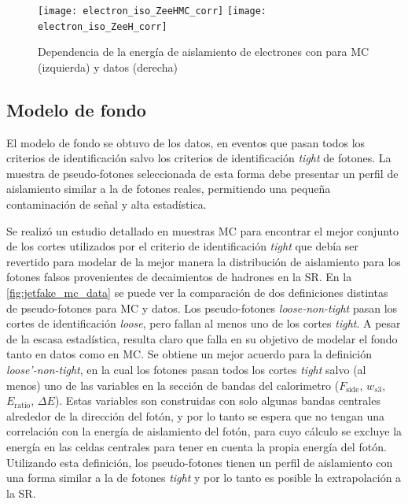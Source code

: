\begin{figure}[!h]
  \centering

  \texttt{[image: electron\_iso\_ZeeHMC\_corr]}
  \texttt{[image: electron\_iso\_ZeeH\_corr]}

  \caption{Dependencia de la energía de aislamiento de electrones con {\HT}
    para MC (izquierda) y datos (derecha) \Zee}
    \label{fig:electron_iso_HT}

\end{figure}



\subsection{Modelo de fondo} \label{sec:jfake_bkg_template}

El modelo de fondo se obtuvo de los datos, en eventos que pasan todos los
criterios de identificación salvo los criterios de identificación \emph{tight}
de fotones. La muestra de pseudo-fotones seleccionada de esta forma debe
presentar un perfil de aislamiento similar a la de fotones reales, permitiendo
una pequeña contaminación de señal y alta estadística.

Se realizó un estudio detallado en muestras MC para encontrar el mejor conjunto
de los cortes utilizados por el criterio de identificación \emph{tight} que debía ser
revertido para modelar de la mejor manera la distribución de aislamiento para
los fotones falsos provenientes de decaimientos de hadrones en la SR. En la
\cref{fig:jetfake_mc_data} se puede ver la comparación de dos definiciones
distintas de pseudo-fotones para MC y datos.
Los pseudo-fotones \emph{loose-non-tight} pasan los cortes de
identificación \emph{loose}, pero fallan al menos uno de los cortes
\emph{tight}. A pesar de la escasa estadística, resulta claro que falla en su
objetivo de modelar el fondo tanto en datos como en MC. Se obtiene un mejor
acuerdo para la definición \emph{loose'-non-tight}, en la cual los
fotones pasan todos los cortes \emph{tight} salvo (al menos) uno de las
variables en la sección de bandas del calorimetro ($F_\text{side}$, $w_{s3}$, $E_\text{ratio}$,
$\Delta E$). Estas variables son construidas con solo algunas bandas centrales
alrededor de la dirección del fotón, y por lo tanto se espera que no tengan una
correlación con la energía de aislamiento del fotón, para cuyo cálculo se excluye
la energía en las celdas centrales para tener en cuenta la
propia energía del fotón. Utilizando esta definición, los pseudo-fotones tienen
un perfil de aislamiento con una forma similar a la de fotones \emph{tight} y
por lo tanto es posible la extrapolación a la SR.

